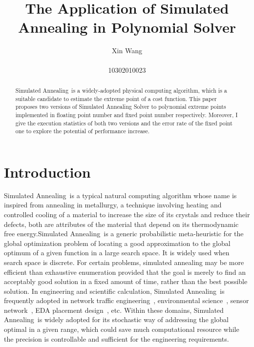 \documentclass[twocolumn]{article}
\newcommand{\SA}{Simulated Annealing~}
\begin{document}
\title{{\bf The Application of Simulated Annealing in Polynomial Solver}\\ }

\author{Xin Wang\\ \vspace{0.5cm}\\
 10302010023}

\date{}
\maketitle
\begin{abstract}
\SA is a widely-adopted physical computing algorithm, which is a suitable candidate to estimate the extreme point of a cost function. This paper proposes two versions of Simulated Annealing Solver to polynomial extreme points implemented in floating point number and fixed point number respectively. Moreover, I give the execution statistics of both two versions and the error rate of the fixed point one to explore the potential of performance increase.
\end{abstract}

\section{Introduction}
\label{intro}
\SA is a typical natural computing algorithm whose name is inspired from  annealing in metallurgy, a technique involving heating and controlled cooling of a material to increase the size of its crystals and reduce their defects, both are attributes of the material that depend on its thermodynamic free energy.\SA is a generic probabilistic meta-heuristic for the global optimization problem of locating a good approximation to the global optimum of a given function in a large search space. It is widely used when search space is discrete. For certain problems, simulated annealing may be more efficient than exhaustive enumeration provided that the goal is merely to find an acceptably good solution in a fixed amount of time, rather than the best possible solution. In engineering and scientific calculation, \SA is frequently adopted in network traffic engineering~\cite{Pasias:2004}, environmental science~\cite{Jingwen:2009}, sensor network~\cite{Zimmerman:2007}, EDA placement design~\cite{Naifeng:2011}, etc. Within these domains, \SA is widely adopted for its stochastic way of addressing the global optimal in a given range, which could save much computational resource while the precision is controllable and sufficient for the engineering requirements.
\end{document}
